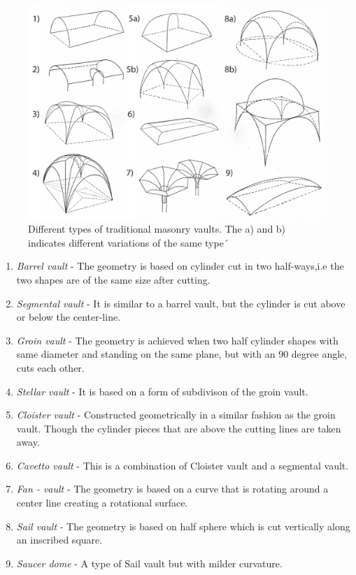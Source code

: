 \begin{figure}[H]
\centering
\includegraphics[width=0.8\linewidth ]{figure/Introduction/TypValvNum.pdf}
\caption{Different types of traditional masonry vaults. The a) and b) indicates different variations of the same type´\cite{ref:murning}}
\end{figure}



\begin{enumerate}
    \item \textit{Barrel vault} - The geometry is based on cylinder cut in two half-ways,i.e the two shapes are of the same size after cutting.
    \item \textit{Segmental vault} -  It is similar to a barrel vault, but the cylinder is cut above or below the center-line.
    \item \textit{Groin vault} -  The geometry is achieved when two half cylinder shapes with same diameter and standing on the same plane, but with an 90 degree angle, cuts each other. 
    \item \textit{Stellar vault} - It is based on a form of subdivison of the groin vault.
    \item \textit{Cloister vault} - Constructed geometrically in a similar fashion as the groin vault. Though the cylinder pieces that are above the cutting lines are taken away.
    \item \textit{Cavetto vault} -  This is a combination of Cloister vault and a segmental vault.
    \item \textit{Fan - vault} - The geometry is based on a curve that is rotating around a center line creating a rotational surface.
    \item \textit{Sail vault} - The geometry is based on half sphere which is cut vertically along an inscribed square.
    \item \textit{Saucer dome} - A type of Sail vault but with milder curvature.
\end{enumerate}



